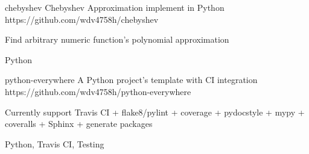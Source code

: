\begin{cvopensources}
  \cvopensource
    {chebyshev}   %
    {Chebyshev Approximation implement in Python}  %
    {https://github.com/wdv4758h/chebyshev}
    {
      \begin{cvitems}
        \item {Find arbitrary numeric function's polynomial approximation}
      \end{cvitems}
    }
    {Python}

  \cvopensource
    {python-everywhere}   %
    {A Python project's template with CI integration}  %
    {https://github.com/wdv4758h/python-everywhere}
    {
      \begin{cvitems}
      \item {Currently support Travis CI + flake8/pylint + coverage + pydocstyle + mypy + coveralls + Sphinx + generate packages}
      \end{cvitems}
    }
    {Python, Travis CI, Testing}

\end{cvopensources}
